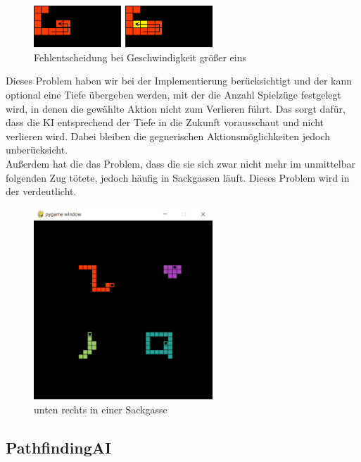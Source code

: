 \begin{figure}[htb]
    \centering
    \includegraphics[width=0.6\textwidth]{Bilder/geschwindigkeit_problem.png}
    \caption{ Fehlentscheidung bei Geschwindigkeit größer eins}
    \label{fig:Geschwindigkeit-Problem}
\end{figure}

Dieses Problem haben wir bei der Implementierung berücksichtigt und der  kann optional eine
Tiefe übergeben werden, mit der die Anzahl Spielzüge festgelegt wird, in denen die gewählte Aktion nicht zum Verlieren
führt.
Das sorgt dafür, dass die \ac{KI} entsprechend der Tiefe in die Zukunft vorausschaut und nicht verlieren wird.
Dabei bleiben die gegnerischen Aktionsmöglichkeiten jedoch unberücksicht. \\

Außerdem hat die  das Problem, dass die sie sich zwar nicht mehr im unmittelbar
folgenden Zug tötete, jedoch häufig in Sackgassen läuft.
Dieses Problem wird in der  verdeutlicht.

\begin{figure}[htb]
    \centering
    \includegraphics[width=0.6\textwidth]{Bilder/Sackgassen_Problem.png}
    \caption{ unten rechts in einer Sackgasse}
    \label{fig:Sackgassen-Problem}
\end{figure}

\subsection{PathfindingAI}
\label{subsec:pathfinding-ai}

